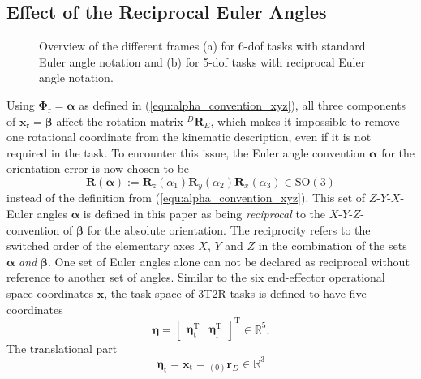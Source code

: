 \documentclass{svproc}
\newcommand{\bm}[1]{\boldsymbol{#1}}
\newcommand{\ortvek}[4]{{ }_{(#1)}{\boldsymbol{#2}}^{#3}_{#4} }
\newcommand{\rotmat}[2]{{{ }^{#1}\boldsymbol{R}}_{#2}}
\newcommand{\transp}[0]{{\mathrm{T}}}
\begin{document}
\subsection{Effect of the Reciprocal Euler Angles}
\label{sec:RecEulAng_effect}


\begin{figure}[htb]
    
    \caption{Overview of the different frames (a) for 6-dof tasks with standard Euler angle notation and (b) for 5-dof tasks with reciprocal Euler angle notation.}
    \label{fig:frames_5dof_6dof}
\end{figure} 


Using $\bm{\Phi}_{\mathrm{r}}{=}\bm{\alpha}$ as defined in (\ref{equ:alpha_convention_xyz}), all three components of $\bm{x}_{\mathrm{r}}{=}\bm{\beta}$ affect the rotation matrix $\rotmat{D}{E}$, which makes it impossible to remove one rotational coordinate from the kinematic description, even if it is not required in the task.
%
To encounter this issue, the Euler angle convention $\bm{\alpha}$ for the orientation error is now chosen to be
\vspace{-0.5em}
%
\begin{equation}
\bm{R}(\bm{\alpha}) := \bm{R}_z(\alpha_1) \bm{R}_y(\alpha_2) \bm{R}_x(\alpha_3) \in \mathrm{SO(3)}
\label{equ:def_rmat_zyxr}
\end{equation}
%
instead of the definition from (\ref{equ:alpha_convention_xyz}).
This set of $Z$-$Y$-$X$-Euler angles $\bm{\alpha}$ is defined in this paper as being \emph{reciprocal} to the $X$-$Y$-$Z$-convention of $\bm{\beta}$ for the absolute orientation.
%
The reciprocity refers to the switched order of the elementary axes $X$, $Y$ and $Z$ in the combination of the sets $\bm{\alpha}$ \emph{and} $\bm{\beta}$.
One set of Euler angles alone can not be declared as reciprocal without reference to another set of angles.
%
Similar to the six end-effector operational space coordinates $\bm{x}$, the task space of 3T2R tasks is defined to have five coordinates
%
\begin{equation}
\bm{\eta}
=
\begin{bmatrix}
\bm{\eta}_{\mathrm{t}}^\transp & 
\bm{\eta}_{\mathrm{r}}^\transp
\end{bmatrix}^\transp
\in {\mathbb{R}}^{5}.
\end{equation}  
%
The translational part
\vspace{-0.5em}
%
\begin{equation}
\bm{\eta}_{\mathrm{t}}
=
\bm{x}_{\mathrm{t}}
=
\ortvek{0}{r}{}{D}
\in {\mathbb{R}}^{3}
\end{equation}  
\end{document}
